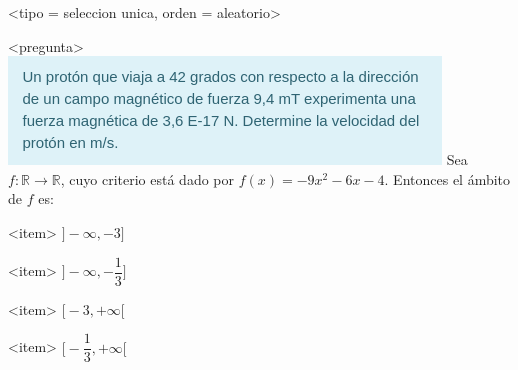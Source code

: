 <tipo = seleccion unica, orden = aleatorio>

<pregunta>
\includegraphics{preg1.png}
Sea $f:\mathbb R \to \mathbb R$, cuyo criterio est\'a dado por $f(x) = -9x^2 -6x -4$. Entonces el \'ambito de $f$ es:


<item>
$\bigg]{-}\infty, -3\bigg]$

<item>
$\bigg]{-}\infty, -\dfrac{1}{3}\bigg]$

<item>
$\bigg[-3, +\infty\bigg[$

<item>
$\bigg[-\dfrac{1}{3}, +\infty\bigg[$



